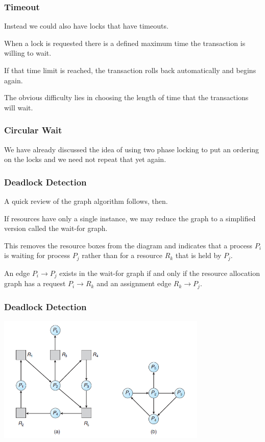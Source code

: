 \begin{frame}
\frametitle{Timeout}

Instead we could also have locks that have timeouts. 

When a lock is requested there is a defined maximum time the transaction is willing to wait. 

If that time limit is reached, the transaction rolls back automatically and begins again. 

The obvious difficulty lies in choosing the length of time that the transactions will wait.

\end{frame}

\begin{frame}
\frametitle{Circular Wait}

We have already discussed the idea of using two phase locking to put an ordering on the locks and we need not repeat that yet again. 


\end{frame}

\begin{frame}
\frametitle{Deadlock Detection}

A quick review of the graph algorithm follows, then. 

If resources have only a single instance, we may reduce the graph to a simplified version called the \alert{wait-for} graph. 

This removes the resource boxes from the diagram and indicates that a process $P_{i}$ is waiting for process $P_{j}$ rather than for a resource $R_{k}$ that is held by $P_{j}$. 

An edge $P_{i} \rightarrow P_{j}$ exists in the wait-for graph if and only if the resource allocation graph has a request $P_{i} \rightarrow R_{k}$ and an assignment edge $R_{k} \rightarrow P_{j}$. 

\end{frame}


\begin{frame}
\frametitle{Deadlock Detection}

\begin{center}
\includegraphics[width=0.75\textwidth]{images/rag-waitfor.png}
\end{center}


\end{frame}


